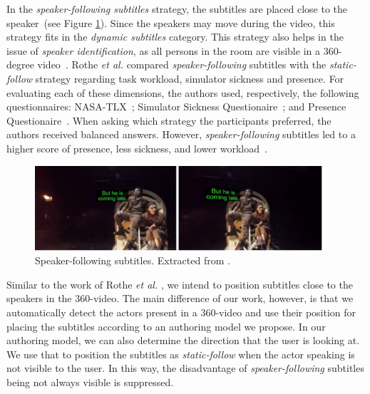 In the \emph{speaker-following subtitles} strategy, the subtitles are placed close to the speaker~(see Figure \ref{fig:speaker_following}). Since the speakers may move during the video, this strategy fits in the \emph{dynamic subtitles} category. This strategy also helps in the issue of \emph{speaker identification}, as all persons in the room are visible in a 360-degree video~\cite{rothe_dynamic_2018}.  
Rothe \emph{et al.} \cite{rothe_dynamic_2018} compared \emph{speaker-following} subtitles with the \emph{static-follow} strategy regarding task workload, simulator sickness and presence. For evaluating each of these dimensions, the authors used, respectively, the following questionnaires: NASA-TLX~\cite{nasa_hart1988development}; Simulator Sickness Questionaire~\cite{sickness_kennedy1993simulator}; and Presence Questionaire~\cite{presence_witmer1998measuring}. When asking which strategy the participants preferred, the authors received balanced answers. However, \emph{speaker-following} subtitles led to a higher score of presence, less sickness, and lower workload~\cite{rothe_dynamic_2018}.

\begin{figure}[!ht]
    \centering
    \includegraphics[width=0.95\textwidth]{img/video360/speaker-following.png}
    \caption{Speaker-following subtitles. Extracted from \cite{hughes_disruptive_2019}.}
    \label{fig:speaker_following}
\end{figure}

Similar to the work of Rothe \emph{et al.} \cite{rothe_dynamic_2018}, we intend to position subtitles close to the speakers in the 360-video. The main difference of our work, however, is that we automatically detect the actors present in a 360-video and use their position for placing the subtitles according to an authoring model we propose. In our authoring model, we can also determine the direction that the user is looking at. We use that to position the subtitles as \emph{static-follow} when the actor speaking is not visible to the user. In this way, the disadvantage of \emph{speaker-following} subtitles being not always visible is suppressed.